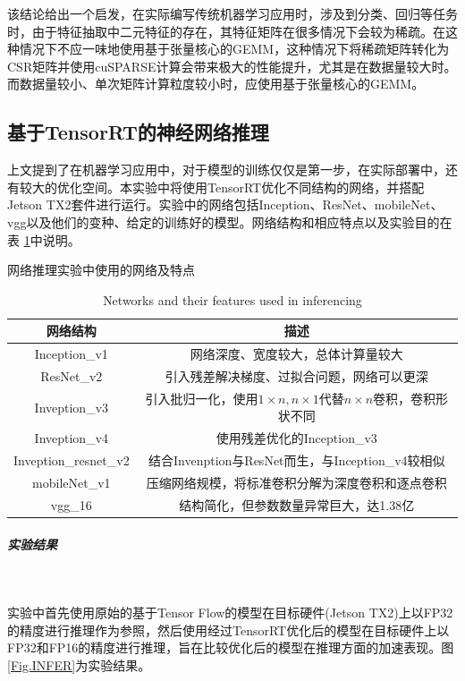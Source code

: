 \par 该结论给出一个启发，在实际编写传统机器学习应用时，涉及到分类、回归等任务时，由于特征抽取中二元特征的存在，其特征矩阵在很多情况下会较为稀疏。在这种情况下不应一味地使用基于张量核心的GEMM，这种情况下将稀疏矩阵转化为CSR矩阵并使用cuSPARSE计算会带来极大的性能提升，尤其是在数据量较大时。而数据量较小、单次矩阵计算粒度较小时，应使用基于张量核心的GEMM。

\subsection{基于TensorRT的神经网络推理}
\par 上文提到了在机器学习应用中，对于模型的训练仅仅是第一步，在实际部署中，还有较大的优化空间。本实验中将使用TensorRT优化不同结构的网络，并搭配Jetson TX2套件进行运行。实验中的网络包括Inception、ResNet、mobileNet、vgg以及他们的变种、给定的训练好的模型。网络结构和相应特点以及实验目的在表 \ref{table-NETWORKS}中说明。
\begin{table}
	\centering
	\renewcommand{\thetable}{\arabic{section}-\arabic{table} }
	\renewcommand{\tablename}{表}
	\caption{网络推理实验中使用的网络及特点}
	\addtocounter{table}{-1}
	\renewcommand{\thetable}{\arabic{section}-\arabic{table} }
	\renewcommand{\tablename}{Table}
	\caption{Networks and their features used in inferencing}
	\begin{tabular}{cc}
		\toprule
		网络结构	&	描述\\
		\midrule
		Inception\_v1 & 网络深度、宽度较大，总体计算量较大\\
		ResNet\_v2 & 引入残差解决梯度、过拟合问题，网络可以更深\\
		Inveption\_v3 & 引入批归一化，使用$ 1\times n, n\times 1 $代替$ n\times n $卷积，卷积形状不同\\
		Inveption\_v4 & 使用残差优化的Inception\_v3\\
		Inveption\_resnet\_v2 & 结合Invenption与ResNet而生，与Inception\_v4较相似\\
		mobileNet\_v1 & 压缩网络规模，将标准卷积分解为深度卷积和逐点卷积\\
		vgg\_16 &  结构简化，但参数数量异常巨大，达1.38亿\\
		\bottomrule
	\end{tabular} \label{table-NETWORKS} 
\end{table}
\subparagraph{实验结果}~{}
\par 实验中首先使用原始的基于Tensor Flow的模型在目标硬件(Jetson TX2)上以FP32的精度进行推理作为参照，然后使用经过TensorRT优化后的模型在目标硬件上以FP32和FP16的精度进行推理，旨在比较优化后的模型在推理方面的加速表现。图 \ref{Fig.INFER}为实验结果。
